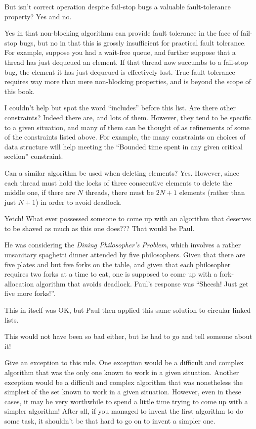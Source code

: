 \QuickQ{}
	But isn't correct operation despite fail-stop bugs
	a valuable fault-tolerance property?
\QuickA{}
	Yes and no.

	Yes in that non-blocking algorithms can provide fault tolerance
	in the face of fail-stop bugs, but no in that this is grossly
	insufficient for practical fault tolerance.
	For example, suppose you had a wait-free queue, and further
	suppose that a thread has just dequeued an element.
	If that thread now succumbs to a fail-stop bug, the element
	it has just dequeued is effectively lost.
	True fault tolerance requires way more than mere non-blocking
	properties, and is beyond the scope of this book.

\QuickQ{}
	I couldn't help but spot the word ``includes'' before this list.
	Are there other constraints?
\QuickA{}
	Indeed there are, and lots of them.
	However, they tend to be specific to a given situation,
	and many of them can be thought of as refinements of some of
	the constraints listed above.
	For example, the many constraints on choices of data structure
	will help meeting the ``Bounded time spent in any given critical
	section'' constraint.

\QuickQ{}
	Can a similar algorithm be used when deleting elements?
\QuickA{}
	Yes.
	However, since each thread must hold the locks of three
	consecutive elements to delete the middle one, if there
	are $N$ threads, there must be $2N+1$ elements (rather than
	just $N+1$) in order to avoid deadlock.

\QuickQ{}
	Yetch!
	What ever possessed someone to come up with an algorithm
	that deserves to be shaved as much as this one does???
\QuickA{}
	That would be Paul.

	He was considering the \emph{Dining Philosopher's Problem}, which
	involves a rather unsanitary spaghetti dinner attended by
	five philosophers.
	Given that there are five plates and but five forks on the table, and
	given that each philosopher requires two forks at a time to eat,
	one is supposed to come up with a fork-allocation algorithm that
	avoids deadlock.
	Paul's response was ``Sheesh!  Just get five more forks!''.

	This in itself was OK, but Paul then applied this same solution to
	circular linked lists.

	This would not have been so bad either, but he had to go and tell
	someone about it!

\QuickQ{}
	Give an exception to this rule.
\QuickA{}
	One exception would be a difficult and complex algorithm that
	was the only one known to work in a given situation.
	Another exception would be a difficult and complex algorithm
	that was nonetheless the simplest of the set known to work in
	a given situation.
	However, even in these cases, it may be very worthwhile to spend
	a little time trying to come up with a simpler algorithm!
	After all, if you managed to invent the first algorithm
	to do some task, it shouldn't be that hard to go on to
	invent a simpler one.


